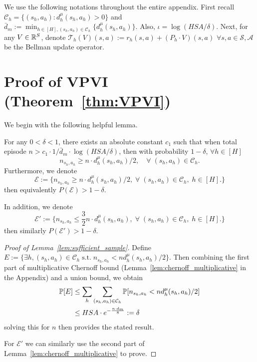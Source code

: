 We use the following notations throughout the entire appendix. First recall $\mathcal{C}_h=\{(s_h,a_h):d^\mu_h(s_h,a_h)>0\}$ and $\bar{d}_m:=\min_{h\in[H],(s_h,a_h)\in\mathcal{C}_h}\{d^\mu_h(s_h,a_h)\}$. Also, $\iota=\log(HSA/\delta)$. Next, for any $V\in\R^S$, denote $\mathcal{T}_h(V)(s,a):=r_h(s,a)+(P_h\cdot V)(s,a)$ $\forall s,a\in\mathcal{S},\mathcal{A}$ be the Bellman update operator.

\section{Proof of VPVI (Theorem~\ref{thm:VPVI})}\label{sec:VPVI_proof}

We begin with the following helpful lemma.

\begin{lemma}\label{lem:sufficient_sample} For any $0<\delta<1$, there exists an absolute constant $c_1$ such that when total episode $n>c_1 \cdot 1/\bar{d}_m\cdot \log(HSA/\delta)$, then with probability $1-\delta$, $\forall h\in[H]$
	\[
	n_{s_h,a_h}\geq n\cdot d^\mu_h(s_h,a_h)/2,\quad\forall \; (s_h,a_h)\in\mathcal{C}_h.
	\]
	Furthermore, we denote 
	\begin{equation}\label{eqn:good_event}
	\mathcal{E}:=\{n_{s_h,a_h}\geq n\cdot d^\mu_h(s_h,a_h)/2,\;\forall \; (s_h,a_h)\in\mathcal{C}_h,\;h\in[H].\}
	\end{equation}
	then equivalently $P(\mathcal{E})>1-\delta$.
	
	In addition, we denote 
	\begin{equation}\label{eqn:good_event_1}
	\mathcal{E}':=\{n_{s_h,a_h}\leq \frac{3}{2} n\cdot d^\mu_h(s_h,a_h),\;\forall \; (s_h,a_h)\in\mathcal{C}_h,\;h\in[H].\}
	\end{equation}
	then similarly $P(\mathcal{E}')>1-\delta$.
\end{lemma}

\begin{proof}[Proof of Lemma~\ref{lem:sufficient_sample}]
	Define $E:=\{\exists h, (s_h,a_h)\in\mathcal{C}_h \;\text{s.t.}\; n_{s_h,a_h} <  n d_h^\mu(s_h,a_h)/2 \}$. Then combining the first part of multiplicative Chernoff bound (Lemma~\ref{lem:chernoff_multiplicative} in the Appendix) and a union bound, we obtain
	\begin{align*}
	\P[E] &\leq \sum_{h}\sum_{(s_h,a_h)\in\mathcal{C}_h} \P[n_{s_h,a_h} < n d^{\mu}_h(s_h,a_h)/2] \\
	&\leq HSA\cdot e^{-\frac{ n\cdot d_m}{8}}:=\delta
	\end{align*}
	solving this for $n$ then provides the stated result.
	
	For $\mathcal{E}'$ we can similarly use the second part of Lemma~\ref{lem:chernoff_multiplicative} to prove.
\end{proof}



